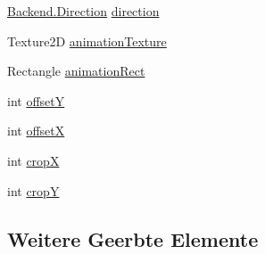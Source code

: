\begin{DoxyCompactItemize}
\item 
\hyperlink{namespace_gruppe22_1_1_backend_a2d53d5d14b8ea0951ba6971e5da1ebf5}{Backend.\-Direction} \hyperlink{class_gruppe22_1_1_client_1_1_actor_view_ad51208acd18670716bde6c746b86655b}{direction}
\item 
Texture2\-D \hyperlink{class_gruppe22_1_1_client_1_1_actor_view_a05942cdc958c646c23de2c6327bd7f54}{animation\-Texture}
\item 
Rectangle \hyperlink{class_gruppe22_1_1_client_1_1_actor_view_ac447bd2a93cd5e534ff446d0244bca63}{animation\-Rect}
\item 
int \hyperlink{class_gruppe22_1_1_client_1_1_actor_view_a9a4c4ec1dc5769d84653c1d41c4cf4dd}{offset\-Y}
\item 
int \hyperlink{class_gruppe22_1_1_client_1_1_actor_view_a1786159bc34dd01c8390b493937df033}{offset\-X}
\item 
int \hyperlink{class_gruppe22_1_1_client_1_1_actor_view_add6a5e3e2f6769eccff26a3d5ea0ef58}{crop\-X}
\item 
int \hyperlink{class_gruppe22_1_1_client_1_1_actor_view_aa61c6d089ffd6ac7170dd2a6375ef85e}{crop\-Y}
\end{DoxyCompactItemize}
\subsection*{Weitere Geerbte Elemente}


